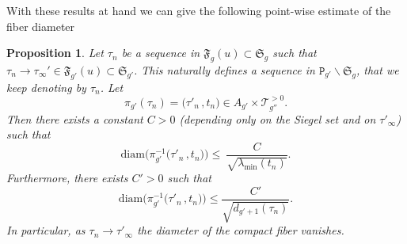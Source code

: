 \documentclass[11pt]{amsart}
\theoremstyle{plain}
\newtheorem{proposition}[theorem]{Proposition}
\theoremstyle{definition}
\theoremstyle{remark}
\newcommand{\fS}{\mathfrak{S}}
\newcommand{\tP}{\mathtt{P}}
\newcommand{\fF}{\mathfrak{F}}
\newcommand{\diam}{\mathrm{diam}}
\newcommand{\cT}[1]{\mathscr{T}_{#1}^{\scriptscriptstyle{>0}}}
\begin{document}
With these results at hand we can give the following point-wise estimate of the fiber diameter

\begin{proposition}\label{pro:fiber.diam.est}
    Let $\tau_n$ be a sequence in $\fF_g(u)\subset \fS_g$ such that $\tau_n\to \tau_\infty'\in \fF_{g'}(u)\subset \fS_{g'}$. This naturally defines a sequence in $\tP_{g'}\backslash\fS_g$, that we keep denoting by $\tau_n$. Let
    \[
        \pi_{g'}(\tau_n)=\big(\tau'_n\,,t_n\big)\in A_{g'}\times\cT{g''}.
    \]
    Then there exists a constant $C>0$ (depending only on the Siegel set and on $\tau'_\infty$) such that
    \begin{equation}\label{eq:diam-lambda}
        \diam\big(\pi_{g'}^{-1}\big(\tau'_n\,,t_n\big)\big) \le\ \frac{C}{\sqrt{\lambda_{\min}(t_n)}}.
    \end{equation}
    Furthermore, there exists $C'>0$ such that
    \begin{equation}\label{eq:diam-dgplus1}
        \diam\big(\pi_{g'}^{-1}\big(\tau'_n\,,t_n\big)\big)\leq \frac{C'}{\sqrt{d_{g'+1}(\tau_n)}}.
    \end{equation}
    In particular, as $\tau_n\to \tau'_\infty$ the diameter of the compact fiber vanishes.
\end{proposition}
\end{document}

